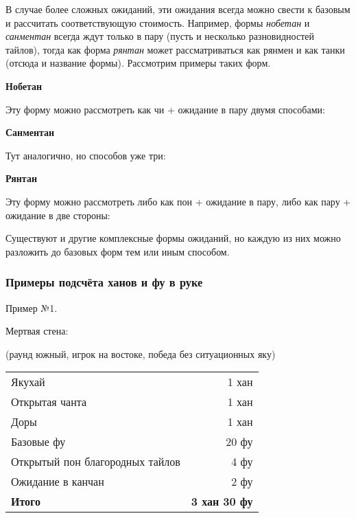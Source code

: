 В случае более сложных ожиданий, эти ожидания всегда можно свести к базовым и рассчитать соответствующую стоимость. Например, формы \textit{нобетан} и \textit{санментан} всегда ждут только в пару (пусть и несколько разновидностей тайлов), тогда как форма \textit{рянтан} может рассматриваться как рянмен и как танки (отсюда и название формы). Рассмотрим примеры таких форм.

\textbf{Нобетан}


Эту форму можно рассмотреть как чи + ожидание в пару двумя способами:



\textbf{Санментан}


Тут аналогично, но способов уже три:




\textbf{Рянтан}


Эту форму можно рассмотреть либо как пон + ожидание в пару, либо как пару + ожидание в две стороны:



Существуют и другие комплексные формы ожиданий, но каждую из них можно разложить до базовых форм тем или иным способом.

\subsubsection{Примеры подсчёта ханов и фу в руке}

Пример №1.

\hfill {}

Мертвая стена:

(раунд южный, игрок на востоке, победа без ситуационных яку)

\begin{tabular}{lr}
	Якухай & 1 хан \\
	Открытая чанта & 1 хан \\
	Доры & 1 хан \\
	Базовые фу & 20 фу \\
	Открытый пон благородных тайлов & 4 фу \\
	Ожидание в канчан & 2 фу \\
	\hline
	\textbf{Итого} & \textbf{3 хан 30 фу} \\
\end{tabular}

